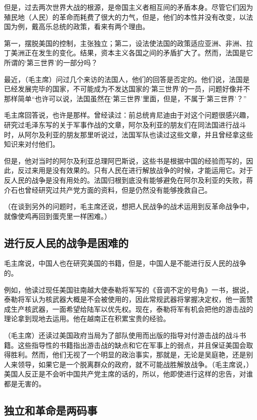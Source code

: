 但是，过去两次世界大战的根源，是帝国主义者相互间的矛盾本身。尽管它们因为殖民地（人民）的革命而耗费了很大的力气，但是，他们的本性并没有改变，以法国为例，戴高乐总统的政策，看来有两个理由。

第一，摆脱美国的控制，主张独立；第二，设法使法国的政策适应亚洲、非洲、拉丁美洲正在发生的变化。结果，资本主义各国之间的矛盾扩大了。然而，法国是它所谓的‘第三世界’的一部分吗？

最近，（毛主席）问过几个来访的法国人，他们的回答是否定的。他们说，法国是已经发展完毕的国家，不可能成为不发达国家的‘第三世界’的一员，问题好像并不那样简单“也许可以说，法国虽然在‘第三世界’里面，但是，不属于‘第三世界’？”

毛主席回答说，也许是那样。曾经读过：前总统肯尼迪由于对这个问题很感兴趣，研究过毛泽东写的关于军事作战的文章，阿尔及利亚的朋友们在同法国进行战斗时，从阿尔及利亚的朋友那里听说过，法国军队也读过这些文章，并且曾经拿这些知识来对付他们。

但是，他对当时的阿尔及利亚总理阿巴斯说，这些书是根据中国的经验而写的，因此，反过来用是没有效果的。只有人民在进行解放战争的时候，才能运用它。对于反人民的战争是没有用处的。法国归根到底没有能够避免在阿尔及利亚的失败，蒋介石也曾经研究过共产党方面的资料，但是仍然没有能够挽救自己。

（在谈到另外的问题时，毛主席还说，想把人民战争的战术运用到反革命战争中，就像使鸡再回到蛋壳里一样困难。）

\subsection{进行反人民的战争是困难的}

毛主席说，中国人也在研究美国的书籍，但是，中国人是不能进行反人民的战争的。

例如，他读过现任美国驻南越大使泰勒将军写的《音调不定的号角》一书，据说，泰勒将军认为核武器大概是不会被使用的，因此常规武器将掌握决定权，他一面赞成生产核武器，一面希望给陆军以优先权。现在，泰勒将军有机会把他的游击战的理论拿到现地去运用。他在越南正在积累宝贵的经验。

（毛主席）还读过美国政府当局为了部队使用而出版的指导对付游击战的战斗书籍。这些指导性的书籍指出游击战的缺点和它在军事上的弱点，并且保证美国会取得胜利。然而，他们无视了一个明显的政治事实，那就是，无论是吴庭艳，还是别人来领导，如果它是一个脱离群众的政府，就不可能战胜解放战争。（毛主席说，）美国人反正是不会听中国共产党主席的话的，所以，他即使进行这样的忠告，对谁都是无害的。

\subsection{独立和革命是两码事}

